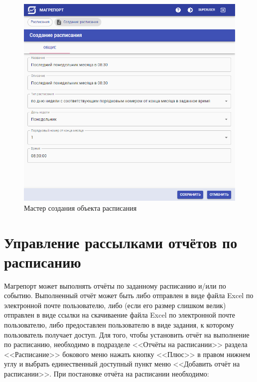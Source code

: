 \documentclass[../user-manual.tex]{subfiles}
\begin{document}
	\begin{figure}[h]
		\centering
		\includegraphics[width=\graphicswidth]{img/29-schedule-create.png}
		\caption{Мастер создания объекта расписания}
		\label{fig:schedule-create}
	\end{figure}
	
	\section{Управление рассылками отчётов по расписанию} \label{administration:schedule-reports}
	
	Магрепорт может выполнять отчёты по заданному расписанию и/или по событию. Выполненный отчёт может быть либо отправлен в виде файла Excel по электронной почте пользователю, либо (если его размер слишком велик) отправлен в виде ссылки на скачиваение файла Excel по электронной почте пользователю, либо предоставлен пользователю в виде задания, к которому пользователь получает доступ. Для того, чтобы установить отчёт на выполнение по расписанию, необходимо в подразделе <<Отчёты на расписании>> раздела <<Расписание>> бокового меню нажать кнопку <<Плюс>> в правом нижнем углу и выбрать единественный доступный пункт меню <<Добавить отчёт на расписании>>. При постановке отчёта на расписании необходимо:
	
\end{document}
